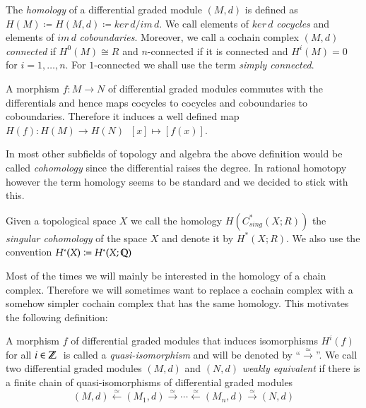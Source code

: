 \begin{Definition}
The \emph{homology} of a differential graded module $(M,d)$ is defined as \newline ${H(M) \coloneqq 
H(M,d) \coloneqq ker \, d / im \, d}$.
We call elements of $ker \, d$ \emph{cocycles} and elements of $im \, d$ \emph{coboundaries}.
Moreover, we call a cochain complex $(M,d)$ \emph{connected} if $H^0(M) \cong R$ and $n$-connected if 
it is connected and $H^i(M) = 0$ for $i = 1, \dotsc, n$. For $1$-connected we shall use the term \emph{simply connected}.
\end{Definition}

A morphism $f \colon M \to N$ of differential graded modules commutes with the differentials and hence maps cocycles to cocycles
and coboundaries to coboundaries. Therefore it induces a well defined map $H(f) \colon H(M) \to H(N) \; \; [x] \mapsto [f(x)]$. 

\begin{Remark}
 In most other subfields of topology and algebra the above definition would be called \emph{cohomology} since the
 differential raises the degree. In rational homotopy however the term homology seems to be standard and we decided 
 to stick with this.
\end{Remark}

\begin{Example}
 Given a topological space $X$ we call the homology $H(C^*_{sing}(X;R))$ the \emph{singular cohomology} of the space $X$
 and denote it by $H^*(X;R)$. We also use the convention $H^*(X) \coloneqq H^*(X; \mathbb{Q})$	
\end{Example}


Most of the times we will mainly be interested in the homology of a chain complex. Therefore we will sometimes want to replace
a cochain complex with a somehow simpler cochain complex that has the same homology. This motivates the following definition:

\begin{Definition}
 A morphism $f$ of differential graded modules that induces isomorphisms $H^i(f)$ for all $i \in \mathbb{Z} \;$ is called a
 \emph{quasi-isomorphism} and will be denoted by ``$\overset{\simeq}{\longrightarrow}$''. \newline
 We call two differential graded modules $(M,d)$ and $(N,d)$ \emph{weakly equivalent} if there is a finite chain of quasi-isomorphisms of differential
 graded modules
 $$ (M,d) \overset{\simeq}{\leftarrow} (M_1,d) \overset{\simeq}{\rightarrow} \cdots 
 \overset{\simeq}{\leftarrow} (M_n,d) \overset{\simeq}{\rightarrow} (N,d)$$
\end{Definition}


